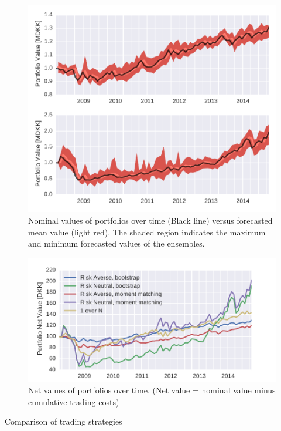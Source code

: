 \begin{figure}[tp]
\centering
\includegraphics{../pic/trading_forecasted_value.pdf}
\caption{Nominal values of portfolios over time (Black line) versus forecasted mean value (light red). The shaded region indicates the maximum and minimum forecasted values of the ensembles.}
\label{fig:tradingforecastedvalues}
\end{figure}

\begin{figure}[tp]
\centering
\includegraphics{../pic/trading_portfolio_value.pdf}
\caption{Net values of portfolios over time. (Net value = nominal value minus cumulative trading costs)}
\label{fig:tradingportfoliovalues}
\end{figure}

\begin{table}
\caption{Comparison of trading strategies}\label{tbl:portfoliotabel}
\centering

\end{table}